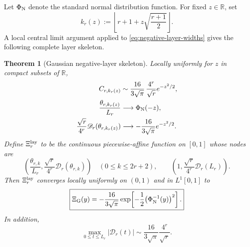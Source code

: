 \documentclass[11pt]{article}
\newtheorem{theorem}{Theorem}[section]
\theoremstyle{definition}
\theoremstyle{remark}
\begin{document}
Let $\Phi_{\rm N}$ denote the standard normal distribution function.  For
fixed $z\in\mathbb R$, set
\begin{equation}
k_r(z):=
\left\lfloor
r+1+z\sqrt{\frac{r+1}{2}}
\right\rfloor .
\label{eq:negative-central-index}
\end{equation}
A local central limit argument applied to \eqref{eq:negative-layer-widths}
gives the following complete layer skeleton.

\begin{theorem}[Gaussian negative-layer skeleton]
\label{thm:negative-gaussian-skeleton}
Locally uniformly for $z$ in compact subsets of $\mathbb R$,
\begin{align}
C_{r,k_r(z)}
&\sim
\frac{16}{3\sqrt\pi}\,
\frac{4^r}{\sqrt r}e^{-z^2/2},
\label{eq:C-gaussian-new}\\
\frac{\theta_{r,k_r(z)}}{L_r}
&\longrightarrow \Phi_{\rm N}(-z),
\label{eq:theta-gaussian-new}\\
\frac{\sqrt r}{4^r}
\mathscr D_r(\theta_{r,k_r(z)})
&\longrightarrow
-\frac{16}{3\sqrt\pi}e^{-z^2/2}.
\label{eq:D-gaussian-new}
\end{align}
Define \(\Xi_r^{\rm lay}\) to be the continuous piecewise-affine function
on \([0,1]\) whose nodes are
\[
 \left(
 \frac{\theta_{r,k}}{L_r},
 \frac{\sqrt r}{4^r}\mathscr D_r(\theta_{r,k})
 \right)
 \quad(0\le k\le2r+2),
 \qquad
 \left(
 1,\frac{\sqrt r}{4^r}\mathscr D_r(L_r)
 \right).
\]
Then \(\Xi_r^{\rm lay}\) converges locally uniformly on \((0,1)\) and in
\(L^1[0,1]\) to
\begin{equation}
\boxed{
\Xi_{\rm G}(y)
=-\frac{16}{3\sqrt\pi}
\exp\!\left[-\frac12\bigl(\Phi_{\rm N}^{-1}(y)\bigr)^2\right].
}
\label{eq:XiG-new}
\end{equation}
In addition,
\begin{equation}
 {
 \max_{0\le t\le L_r}|\mathscr D_r(t)|
 \sim
 \frac{16}{3\sqrt\pi}\frac{4^r}{\sqrt r}.}
 \label{eq:sharp-D-amplitude}
\end{equation}
\end{theorem}
\end{document}
